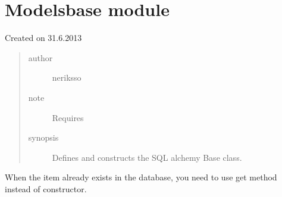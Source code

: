 \documentclass[letterpaper,10pt,english]{sphinxmanual}
\begin{document}
\section{Modelsbase module}
\label{modelsbase:module-modelsbase}\label{modelsbase::doc}\label{modelsbase:modelsbase-module}
Created on 31.6.2013
\begin{quote}\begin{description}
\item[{author}] \leavevmode
neriksso

\item[{note}] \leavevmode
Requires 

\item[{synopsis}] \leavevmode
Defines and constructs the SQL alchemy Base class.

\end{description}\end{quote}

\begin{fulllineitems}
\label{modelsbase:modelsbase.ItemAlreadyExistsException}
When the item already exists in the database, you need to use
get method instead of constructor.

\end{fulllineitems}

\end{document}
